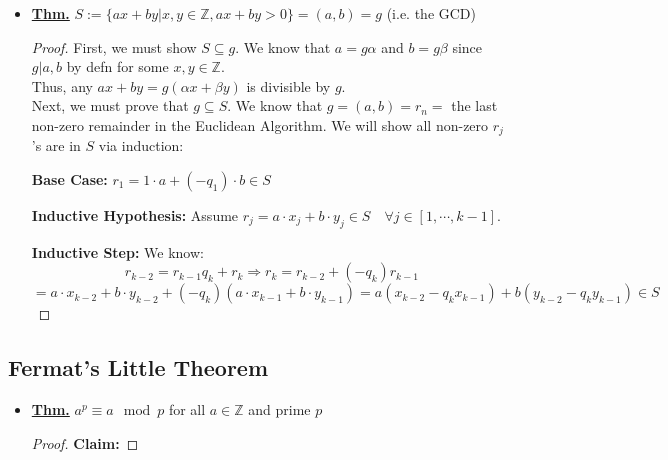 \documentclass[11pt]{article}
\newcommand{\thm}{\underline{\textbf{Thm.}} }
\begin{document}
\begin{itemize}
\begin{itemize}
        \item \(a = bq_1 + r_1, \, 0 \leq r_1 < b\)
        \item \(b = r_1q_2 + r_2, \, 0 \leq r_2 < r_1\)
        \item \(r_1 = r_2q_3 + r_3, \, 0 \leq r_3 < r_2\)
        \item \(\vdots\)
        \item \(r_{n-1} = r_nq_{n+1} + r_{n+1}\)
        \item Eventually, \(r_{n+1} = 0\), so \(r_{n-1} = r_nq_{n+1} + 0\)
        \item Thus, \((a,b) = r_n\)
        \item Eventually, we will prove this is a polynomial time algorithm.
    \end{itemize}
    \item \thm \(S := \{ax+by | x,y \in \mathbb{Z}, ax+by > 0\} = (a,b) = g\) (i.e. the GCD)
    \begin{proof}
        First, we must show \(S \subseteq g\). We know that \(a = g \alpha\) and \(b = g \beta\) since \(g|a,b\) by defn for some \(x,y \in \mathbb{Z}\). \\

        Thus, any \(ax+by = g(\alpha x + \beta y)\) is divisible by \(g\). \\

        Next, we must prove that \(g \subseteq S\). We know that \(g = (a,b) = r_n = \) the last non-zero remainder in the Euclidean Algorithm. We will show all non-zero \(r_j\)'s are in \(S\) via induction:

        \textbf{Base Case:} \(r_1 = 1 \cdot a + (-q_1) \cdot b \in S\)

        \textbf{Inductive Hypothesis:} Assume \(r_j = a \cdot x_j + b \cdot y_j \in S \quad \forall j \in [1, \cdots, k-1]\).

        \textbf{Inductive Step:} We know:
        \[
        r_{k-2} = r_{k-1}q_k + r_k \Rightarrow r_k = r_{k-2} + (-q_k) r_{k-1}
        \]
        \[
            = a \cdot x_{k-2} + b \cdot y_{k-2} + (-q_k) (a \cdot x_{k-1} + b \cdot y_{k-1}) = a (x_{k-2} - q_k x_{k-1}) + b (y_{k-2} - q_k y_{k-1}) \in S
        \]
    \end{proof}
\end{itemize}

\subsection{Fermat's Little Theorem}
\begin{itemize}
    \item \thm \(a^p \equiv a \mod p\) for all \(a \in \mathbb{Z}\) and prime \(p\)
    \begin{proof}
        \textbf{Claim:} 
    \end{proof}
\end{itemize}
\end{document}
